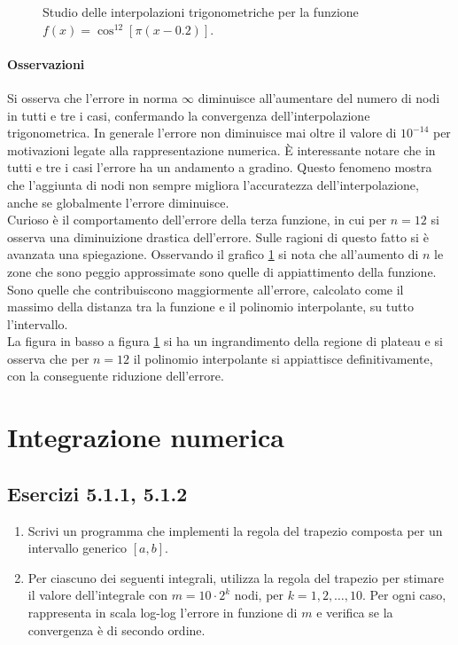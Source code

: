 \documentclass[letterpaper, 12pt]{article}
\numberwithin{equation}{section}    %
\begin{document}
\begin{figure}[!ht]
\begin{minipage}[b]{0.47\textwidth}
    \end{minipage}
    \caption{Studio delle interpolazioni trigonometriche per la funzione $f(x) = \cos^{12}[\pi (x-0.2)]$.}
    \label{fig:es4_6_1_3}
\end{figure}

\paragraph{Osservazioni}
Si osserva che l'errore in norma $\infty$ diminuisce all'aumentare del numero di nodi in tutti e tre i casi, 
confermando la convergenza dell'interpolazione trigonometrica. In generale l'errore non diminuisce mai oltre
il valore di $10^{-14}$ per motivazioni legate alla rappresentazione numerica. È interessante notare che 
in tutti e tre i casi l'errore ha un andamento a gradino. Questo fenomeno mostra che l'aggiunta di nodi 
non sempre migliora l'accuratezza dell'interpolazione, anche se globalmente l'errore diminuisce. \\
Curioso è il comportamento dell'errore della terza funzione, in cui per $n = 12$ si osserva una
diminuizione drastica dell'errore. Sulle ragioni di questo fatto si è avanzata una spiegazione. 
Osservando il grafico \ref{fig:es4_6_1_3} si nota che all'aumento di $n$ le zone che sono peggio approssimate sono 
quelle di appiattimento della funzione. Sono quelle che contribuiscono maggiormente all'errore, calcolato
come il massimo della distanza tra la funzione e il polinomio interpolante, su tutto l'intervallo. \\
La figura in basso a figura \ref{fig:es4_6_1_3} si ha un ingrandimento della regione di plateau e 
si osserva che per $n=12$ il polinomio interpolante si appiattisce definitivamente, con la conseguente 
riduzione dell'errore.

\section{Integrazione numerica}
\subsection{Esercizi 5.1.1, 5.1.2}
\begin{enumerate}
    \item Scrivi un programma che implementi la regola del trapezio composta per un intervallo generico $[a,b]$.
    \item Per ciascuno dei seguenti integrali, utilizza la regola del trapezio per stimare il valore dell'integrale con $m=10\cdot 2^k$ nodi, per $k=1,2,\ldots,10$. Per ogni caso, rappresenta in scala log-log l'errore in funzione di $m$ e verifica se la convergenza è di secondo ordine.
\end{enumerate}
\end{document}
